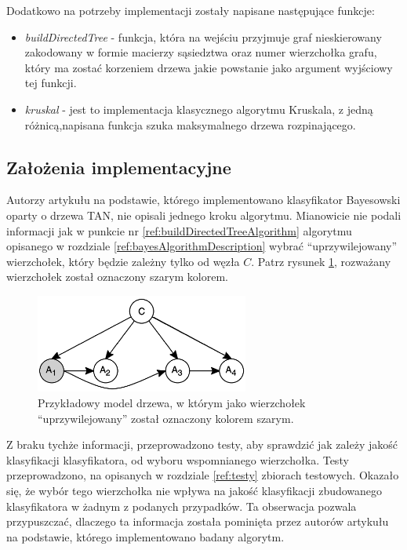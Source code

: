 \documentclass[paper=a4, fontsize=11pt]{scrartcl} %
\numberwithin{equation}{section} %
\numberwithin{figure}{section} %
\numberwithin{table}{section} %
\begin{document}
Dodatkowo na potrzeby implementacji zostały napisane następujące funkcje:
\begin{itemize}
 \item \textit{buildDirectedTree} - funkcja, która na wejściu przyjmuje graf nieskierowany zakodowany w formie macierzy sąsiedztwa oraz numer wierzchołka grafu, który ma zostać korzeniem drzewa jakie powstanie jako argument wyjściowy tej funkcji.
 \item \textit{kruskal} - jest to implementacja klasycznego algorytmu Kruskala, z jedną różnicą,napisana funkcja szuka maksymalnego drzewa rozpinającego.
\end{itemize}

\subsection{Założenia implementacyjne}

Autorzy artykułu \cite{Bayesian_Network_Classifiers} na podstawie, którego implementowano klasyfikator Bayesowski oparty o drzewa TAN, nie opisali jednego kroku algorytmu. Mianowicie nie podali informacji jak w punkcie nr \ref{ref:buildDirectedTreeAlgorithm} algorytmu opisanego w rozdziale  \ref{ref:bayesAlgorithmDescription} wybrać "`uprzywilejowany"' wierzchołek, który będzie zależny tylko od węzła $C$. Patrz rysunek \ref{fig:model_drzewa_zacieniowany}, rozważany wierzchołek został oznaczony szarym kolorem. 


\begin{figure}[h]
 \centering
 \includegraphics[width=70mm]{model2.png}
 \caption{Przykładowy model drzewa, w którym jako wierzchołek "`uprzywilejowany"' został oznaczony kolorem szarym. }
 \label{fig:model_drzewa_zacieniowany}
\end{figure}

Z braku tychże informacji, przeprowadzono testy, aby sprawdzić jak zależy jakość klasyfikacji klasyfikatora, od wyboru wspomnianego wierzchołka. Testy przeprowadzono, na opisanych w rozdziale \ref{ref:testy} 
zbiorach testowych. Okazało się, że wybór tego wierzchołka nie wpływa na jakość klasyfikacji zbudowanego klasyfikatora w żadnym z podanych przypadków. Ta obserwacja pozwala przypuszczać, dlaczego ta informacja została pominięta przez autorów artykułu na podstawie, którego implementowano badany algorytm.
\end{document}

